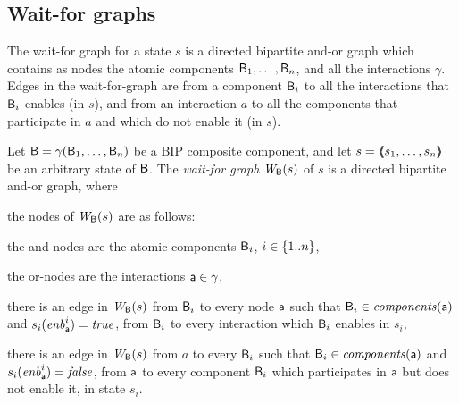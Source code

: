 \subsection{Wait-for graphs}
\label{secn:wait-for-graphs}

The wait-for graph for a state $s$ is a directed bipartite and-or
graph which contains as nodes the atomic components $\mathsf{B}_1, \ldots,
\mathsf{B}_n$, and all the interactions $\gamma$.  Edges in the wait-for-graph
are from a component $\mathsf{B}_i$ to all the interactions that $\mathsf{B}_i$ enables (in $s$),
and from an interaction $a$ to all the components that participate in
$a$ and which do not enable it (in $s$).


\begin{definition}
\label{def:static:wait-for-graph} 
\label{defn:static:wait-for-graph} 
Let $\mathsf{B} = \gamma(\mathsf{B}_1,\dots,\mathsf{B}_n)$ be a BIP composite component, and let
$s = \langle \hspace{-0.34em} \langle \hspace{-0.34em} \langle s_1,\ldots,s_n \rangle \hspace{-0.34em} \rangle \hspace{-0.34em} \rangle$ be an arbitrary state of $\mathsf{B}$.
The {\em wait-for graph} $\mathit{W}_{\mathsf{B}}({s})$ of $s$ is a directed bipartite and-or graph, where
\begin{nlst1}

\item \label{def:static:wait-for-graph:nodes} the nodes of $\mathit{W}_{\mathsf{B}}({s})$ are as follows:
%
   \begin{nlst2}
   \item the and-nodes are the atomic components $\mathsf{B}_i$, $i \in \{ 1..n \}$,
   \item the or-nodes are the interactions $\mathsf{a} \in \gamma$,
   \end{nlst2}

\item \label{def:static:wait-for-graph:edges-aut-action} 
   there is an edge in $\mathit{W}_{\mathsf{B}}({s})$ from $\mathsf{B}_i$ to every node 
   $\mathsf{a}$ such that $\mathsf{B}_i \in \mathit{components}(\mathsf{a})$ and $s_i(\mathit{enb}_{\mathsf{a}}^{i}) = \mathit{true}$, \ie from $\mathsf{B}_i$ to every interaction
   which $\mathsf{B}_i$ enables in $s_i$,

\item  \label{def:static:wait-for-graph:edges-action-aut}
   there is an edge in $\mathit{W}_{\mathsf{B}}({s})$ from $a$ to every 
   $\mathsf{B}_i$ such that $\mathsf{B}_i \in \mathit{components}(\mathsf{a})$ and $s_i(\mathit{enb}_{\mathsf{a}}^{i}) = \mathit{false}$, \ie from $\mathsf{a}$ to every component
   $\mathsf{B}_i$ which participates in $\mathsf{a}$ but does not enable it, in state $s_i$.
                  
\end{nlst1}
\end{definition}

